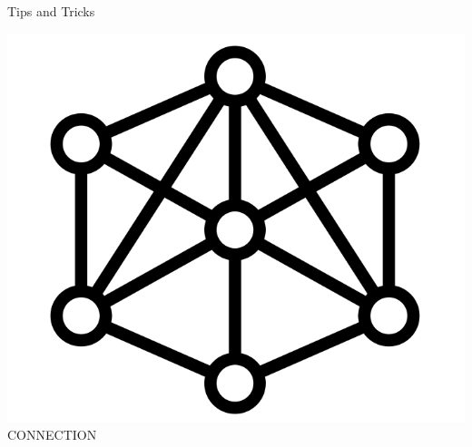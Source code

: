 \documentclass[12pt, aspectratio=43]{beamer}
\begin{document}
\begin{frame}{Tips and Tricks}
\begin{center}
    \includegraphics[scale=0.35]{images/Connection.png} \\
    CONNECTION
\end{center}
\end{frame}
\end{document}
